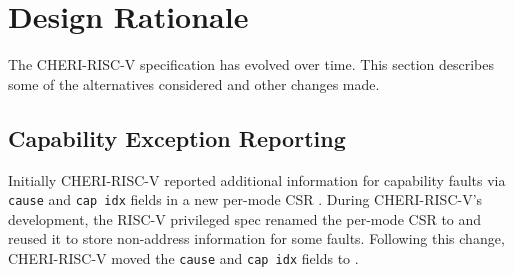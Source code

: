 

%


\section{Design Rationale}

The CHERI-RISC-V specification has evolved over time.  This section
describes some of the alternatives considered and other changes made.

\subsection{Capability Exception Reporting}

Initially CHERI-RISC-V reported additional information for capability
faults via \texttt{cause} and \texttt{cap idx} fields in a new
per-mode CSR \xccsr{}.  During CHERI-RISC-V's development, the RISC-V
privileged spec renamed the per-mode \xbadaddr{} CSR to \xtval{} and
reused it to store non-address information for some faults.  Following
this change, CHERI-RISC-V moved the \texttt{cause} and \texttt{cap
  idx} fields to \xtval{}.

